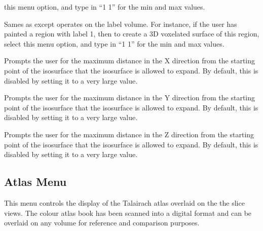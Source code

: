 \begin{description}
    this menu option, and type in ``1 1'' for the min and max values.
\item[\menutwo{Create Surface}{Label Voxelate}]  Sames as
     except operates on
    the label volume.  For instance, if the user has painted a region
    with label 1, then to create a 3D voxelated surface of this region,
    select this menu option, and type in ``1 1'' for the min and max values.
\item[\menutwo{Create Surface}{X Dist}]  Prompts the user for the maximum
    distance in the X direction from the starting point of the isosurface
    that the isosurface is allowed to expand.  By default, this is disabled
    by setting it to a very large value.
\item[\menutwo{Create Surface}{Y Dist}]  Prompts the user for the maximum
    distance in the Y direction from the starting point of the isosurface
    that the isosurface is allowed to expand.  By default, this is disabled
    by setting it to a very large value.
\item[\menutwo{Create Surface}{Z Dist}]  Prompts the user for the maximum
    distance in the Z direction from the starting point of the isosurface
    that the isosurface is allowed to expand.  By default, this is disabled
    by setting it to a very large value.
\end{description}

\subsection{Atlas Menu}

This menu controls the display of the Talairach atlas overlaid on the
the slice views.  The colour atlas book has been scanned into a digital
format and can be overlaid on any volume for reference and comparison
purposes.


